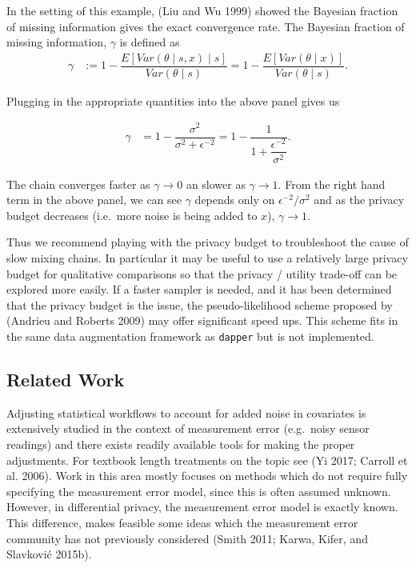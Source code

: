 In the setting of this example, (Liu and Wu 1999) showed the Bayesian fraction of missing information
gives the exact convergence rate. The Bayesian fraction of missing information, \(\gamma\) is
defined as
\begin{align*}
\gamma &:= 1 - \dfrac{E[Var(\theta \mid s, x) \mid s]}{Var(\theta \mid s)} = 1 - \dfrac{E[Var(\theta \mid x)]}{Var(\theta \mid s)}.
\end{align*}

Plugging in the appropriate quantities into the above panel gives us

\begin{align*}
\gamma &= 1 - \dfrac{\sigma^2}{\sigma^2 + \epsilon^{-2}} = 1 - \dfrac{1}{1 + \dfrac{\epsilon^{-2}}{\sigma^2}}.
\end{align*}

The chain converges faster as \(\gamma \to 0\) an slower as \(\gamma \to 1\).
From the right hand term in the above panel, we can see \(\gamma\)
depends only on \(\epsilon^{-2}/\sigma^2\) and as the privacy budget decreases (i.e.~more noise is being added to \(x\)),
\(\gamma \to 1\).

Thus we recommend playing with the privacy budget to troubleshoot the cause of slow mixing
chains. In particular it may be useful to use a relatively large
privacy budget for qualitative comparisons so that the privacy / utility trade-off can
be explored more easily. If a faster sampler is needed, and it has been
determined that the privacy budget is the issue, the pseudo-likelihood scheme proposed by (Andrieu and Roberts 2009)
may offer significant speed ups. This scheme fits in the same data augmentation framework as \texttt{dapper} but is not implemented.

\hypertarget{related-work}{%
\subsection{Related Work}\label{related-work}}

Adjusting statistical workflows to account for added noise in covariates
is extensively studied in the context of measurement error (e.g.~noisy sensor readings)
and there exists readily available tools for making the proper adjustments.
For textbook length treatments on the topic see (Yi 2017; Carroll et al. 2006).
Work in this area mostly focuses on methods which do not require fully specifying the
measurement error model, since this is often assumed unknown.
However, in differential privacy, the measurement error model is exactly known.
This difference, makes feasible some ideas which the measurement
error community has not previously considered (Smith 2011; Karwa, Kifer, and Slavković 2015b).

